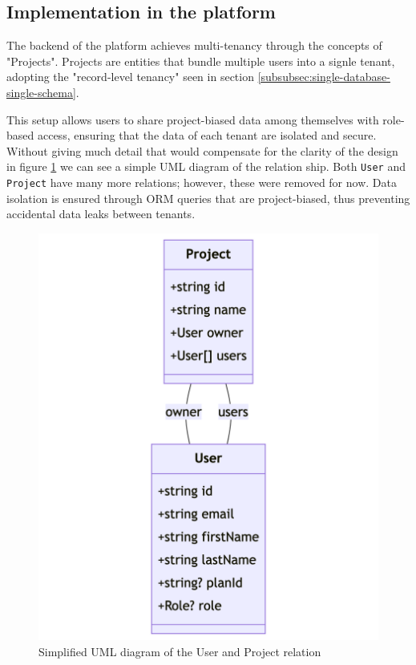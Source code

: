 \subsection{Implementation in the platform}
The backend of the platform achieves multi-tenancy through the concepts of "Projects".
Projects are entities that bundle multiple users into a signle tenant, adopting the "record-level tenancy" seen in section \ref{subsubsec:single-database-single-schema}.

This setup allows users to share project-biased data among themselves with role-based access, ensuring that the data of each tenant are isolated and secure.
Without giving much detail that would compensate for the clarity of the design in figure \ref{img04:uml-user-project} we can see a simple UML diagram of the relation ship. 
Both \texttt{User} and \texttt{Project} have many more relations; however, these were removed for now.
Data isolation is ensured through ORM queries that are project-biased, thus preventing accidental data leaks between tenants.





\begin{figure}[p]\centering
\includegraphics[width=140mm]{img/chap04/fig_simplified_project_concept.png}
\caption{Simplified UML diagram of the User and Project relation}
\label{img04:uml-user-project}
\end{figure}

